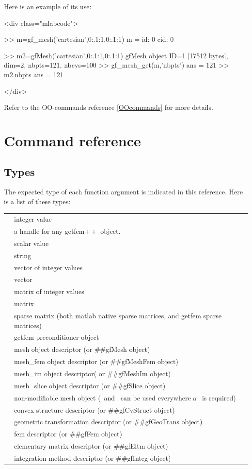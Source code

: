 \documentclass[11pt,a4paper]{article}
\newcommand{\hypertarget}[1]{\label{#1}}
\newcommand{\sf}[1]{#1}
\newcommand{\kw}[1]{\textcolor{darkblue}{\texttt{#1}}}
\newcommand{\vartype}[1]{\xmlattributes*{a}{class="mltype"}{\link{#1}{typelist}}}
\newenvironment{matlab}{\begin{rawxml}<div class="mlabcode">\end{rawxml}\begin{example}}{\end{example}\begin{rawxml}</div>\end{rawxml}}
\newcommand{\kw}[1]{\textcolor{darkblue}{\texttt{#1}}}
\newcommand{\vartype}[1]{\texttt{\textit{\hyperlink{typelist}{\textcolor{darkred}{#1}}}}}
\newenvironment{matlab}{\begin{alltt}}{\end{alltt}}
\newcommand{\tint}{\vartype{int}\xspace}
\newcommand{\thobj}{\vartype{hobj}\xspace}
\newcommand{\tscal}{\vartype{scalar}\xspace}
\newcommand{\tvec}{\vartype{vec}\xspace}
\newcommand{\tivec}{\vartype{ivec}\xspace}
\newcommand{\tmesh}{\vartype{mesh}\xspace}
\newcommand{\tcmesh}{\vartype{const\_mesh}\xspace}
\newcommand{\tcvstruct}{\vartype{cvstruct}\xspace}
\newcommand{\tgeotrans}{\vartype{geotrans}\xspace}
\newcommand{\tmf}{\vartype{mesh\_fem}\xspace}
\newcommand{\tmim}{\vartype{mesh\_im}\xspace}
\newcommand{\tslc}{\vartype{mesh\_slice}\xspace}
\newcommand{\tfem}{\vartype{fem}\xspace}
\newcommand{\teltm}{\vartype{eltm}\xspace}
\newcommand{\tinteg}{\vartype{integ}\xspace}
\newcommand{\timat}{\vartype{imat}\xspace}
\newcommand{\tmat}{\vartype{mat}\xspace}
\newcommand{\tspmat}{\vartype{spmat}\xspace}
\newcommand{\tprecond}{\vartype{precond}\xspace}
\newcommand{\tstr}{\vartype{string}\xspace}
\newcommand{\mlab}{{\sf matlab}\xspace}
\newcommand{\gf}{{\sf getfem${++}$}\xspace}
\begin{document}
Here is an example of its use:
\begin{matlab}
>> m=gf_mesh('cartesian',0:.1:1,0:.1:1) 
m = 
     id: 0
    cid: 0

>> m2=gfMesh('cartesian',0:.1:1,0:.1:1)
gfMesh object ID=1 [17512 bytes], dim=2, nbpts=121, nbcvs=100
>> gf_mesh_get(m,'nbpts')
ans =
   121
>> m2.nbpts
ans =
   121
\end{matlab}
Refer to the OO-commands reference \ref{OOcommands} for more details.

\section{Command reference}
\subsection{Types}
\hypertarget{typelist}
The expected type of each function argument is indicated in this reference.
Here is a list of these types:
\begin{tabular}{lp{}}
  \tint  & integer value \\
  \thobj & a handle\index{handle} for any \gf object.\\
  \tscal & scalar value \\
  \tstr  & string \\
  \tivec & vector of integer values \\
  \tvec  & vector \\
  \timat & matrix of integer values \\
  \tmat  & matrix \\
  \tspmat  & sparse matrix (both matlab native sparse matrices, and getfem sparse matrices)\\
  \tprecond & getfem preconditioner object\\
  \tmesh & mesh object descriptor (or ##gfMesh object)\\
  \tmf   & mesh\_fem object descriptor (or ##gfMeshFem object)\\
  \tmim  & mesh\_im object descriptor( or ##gfMeshIm object)\\
  \tslc  & mesh\_slice object descriptor (or ##gfSlice object)\\
  \tcmesh& non-modifiable mesh object (\tmesh\ and \tmf\ can be used everywhere a \tcmesh\ is required) \\
  \tcvstruct & convex structure descriptor (or ##gfCvStruct object) \\
  \tgeotrans & geometric transformation descriptor (or ##gfGeoTrans object)\\
  \tfem  & fem descriptor (or ##gfFem object)\\
  \teltm & elementary matrix descriptor (or ##gfEltm object)\\
  \tinteg & integration method descriptor (or ##gfInteg object)
\end{tabular}
\end{document}
